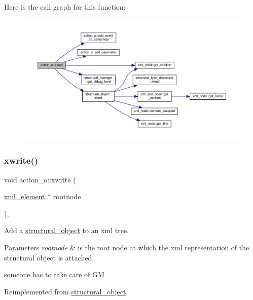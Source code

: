 Here is the call graph for this function\+:
\nopagebreak
\begin{figure}[H]
\begin{center}
\leavevmode
\includegraphics[width=350pt]{d2/ded/classaction__o_ab48f20e726813634d18e4702b199874b_cgraph}
\end{center}
\end{figure}
\mbox{\label{classaction__o_ace0907025534f0523c2f322a24f36ac8}} 
\subsubsection{\texorpdfstring{xwrite()}{xwrite()}}
{\footnotesize\ttfamily void action\+\_\+o\+::xwrite (\begin{DoxyParamCaption}\item[{\hyperlink{classxml__element}{xml\+\_\+element} $\ast$}]{rootnode }\end{DoxyParamCaption})\hspace{0.3cm}{\ttfamily [override]}, {\ttfamily [virtual]}}



Add a \hyperlink{classstructural__object}{structural\+\_\+object} to an xml tree. 


\begin{DoxyParams}{Parameters}
{\em rootnode} & is the root node at which the xml representation of the structural object is attached. \\
\hline
\end{DoxyParams}
someone has to take care of GM 

Reimplemented from \hyperlink{classstructural__object_a7b0b509094451578b2dc10a9b716b16e}{structural\+\_\+object}.



